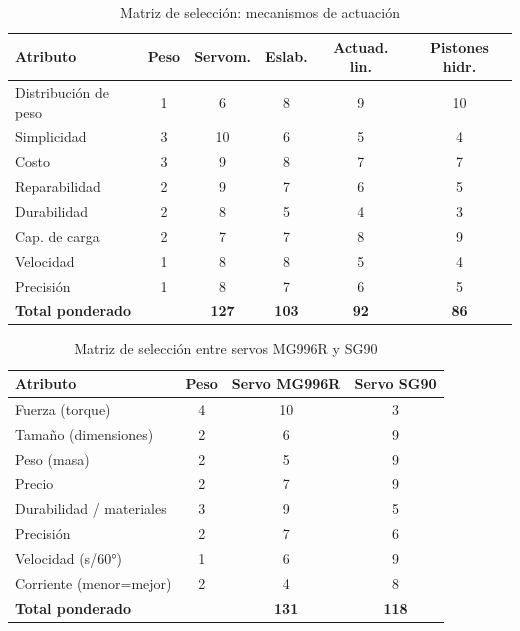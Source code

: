 \documentclass[11pt,a4paper]{article}
\begin{document}
\begin{table}[H]
\centering
\caption{Matriz de selección: mecanismos de actuación}
\begin{tabular}{lccccc}
\toprule
\textbf{Atributo} &\textbf{Peso} &\textbf{Servom.} &\textbf{Eslab.} &\textbf{Actuad. lin.} &\textbf{Pistones hidr.} \\
\midrule
Distribución de peso & 1 & 6  & 8  & 9 & 10 \\
Simplicidad          & 3 & 10 & 6  & 5 & 4  \\
Costo                & 3 & 9  & 8  & 7 & 7  \\
Reparabilidad        & 2 & 9  & 7  & 6 & 5  \\
Durabilidad          & 2 & 8  & 5  & 4 & 3  \\
Cap. de carga      & 2 & 7  & 7  & 8 & 9  \\
Velocidad            & 1 & 8  & 8  & 5 & 4  \\
Precisión            & 1 & 8  & 7  & 6 & 5  \\
\midrule
\textbf{Total ponderado}       &    & \textbf{127} & \textbf{103} & \textbf{92} & \textbf{86} \\
\bottomrule
\end{tabular}
\end{table}

\begin{table}[H]
\centering
\caption{Matriz de selección entre servos MG996R y SG90}
\begin{tabular}{lccc}
\toprule
\textbf{Atributo} & \textbf{Peso} & \textbf{Servo MG996R} & \textbf{Servo SG90} \\
\midrule
Fuerza (torque)        & 4 & 10 & 3 \\
Tamaño (dimensiones)   & 2 & 6  & 9 \\
Peso (masa)            & 2 & 5  & 9 \\
Precio                 & 2 & 7  & 9 \\
Durabilidad / materiales & 3 & 9 & 5 \\
Precisión              & 2 & 7  & 6 \\
Velocidad (s/60°)      & 1 & 6  & 9 \\
Corriente (menor=mejor) & 2 & 4  & 8 \\
\midrule
\textbf{Total ponderado} &   & \textbf{131} & \textbf{118} \\
\bottomrule
\end{tabular}
\end{table}
\end{document}
